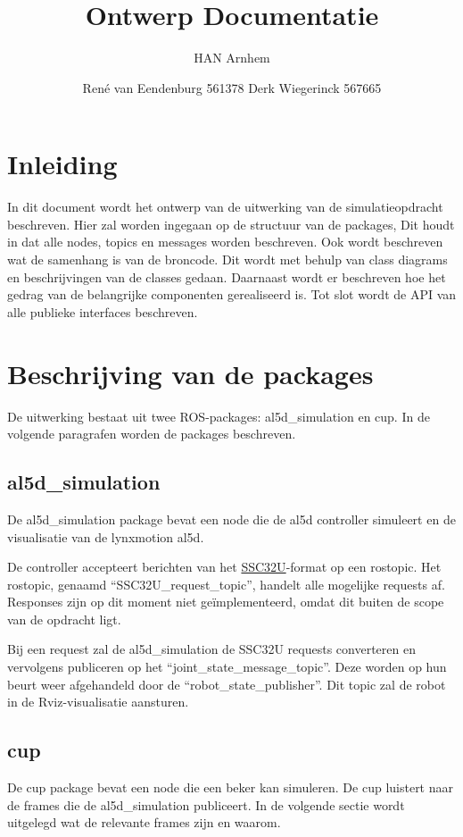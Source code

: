 \documentclass[11pt,titlepage]{article}
\author{René van Eendenburg 561378 \cr Derk Wiegerinck 567665}
\title{Ontwerp Documentatie}
\subtitle{HAN Arnhem}{Versie 1}{WOR-World}
\begin{document}
\maketitle



\tableofcontents
\clearpage


\section{Inleiding}
In dit document wordt het ontwerp van de uitwerking van de simulatieopdracht beschreven. Hier zal worden ingegaan op de structuur van de packages, Dit houdt in dat alle nodes, topics en messages worden beschreven. Ook wordt beschreven wat de samenhang is van de broncode. Dit wordt met behulp van class diagrams en beschrijvingen van de classes gedaan. Daarnaast wordt er beschreven hoe het gedrag van de belangrijke componenten gerealiseerd is. Tot slot wordt de API van alle publieke interfaces beschreven.

\section{Beschrijving van de packages}
De uitwerking bestaat uit twee ROS-packages: al5d\_simulation en cup. In de volgende paragrafen worden de packages beschreven.

\subsection{al5d\_simulation}
De al5d\_simulation package bevat een node die de al5d controller simuleert en de visualisatie van de lynxmotion al5d.

De controller accepteert berichten van het \href{https://www.robotshop.com/media/files/pdf2/lynxmotion_ssc-32u_usb_user_guide.pdf
}{SSC32U}-format op een rostopic. Het rostopic, genaamd ``SSC32U\_request\_topic'', handelt alle mogelijke requests af. Responses zijn op dit moment niet geïmplementeerd, omdat dit buiten de scope van de opdracht ligt.

Bij een request zal de al5d\_simulation de SSC32U requests converteren en vervolgens publiceren op het ``joint\_state\_message\_topic''. Deze worden op hun beurt weer afgehandeld door de ``robot\_state\_publisher''. Dit topic zal de robot in de Rviz-visualisatie aansturen.

\subsection{cup}
De cup package bevat een node die een beker kan simuleren. De cup luistert naar de frames die de al5d\_simulation publiceert. In de volgende sectie wordt uitgelegd wat de relevante frames zijn en waarom.
\end{document}
